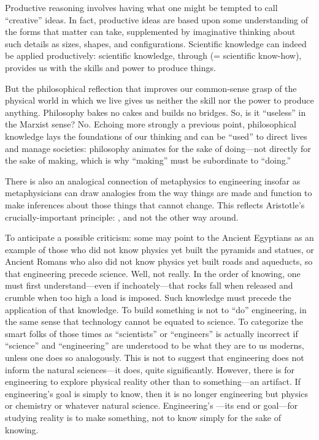 Productive reasoning involves having what one might be tempted to call ``creative'' ideas. In fact, productive ideas are based upon some understanding of the forms that matter can take, supplemented by imaginative thinking about such details as sizes, shapes, and configurations. Scientific knowledge can indeed be applied productively: scientific knowledge, through  (= scientific know-how), provides us with the skills and power to produce things.

But the philosophical reflection that improves our common-sense grasp of the physical world in which we live gives us neither the skill nor the power to produce anything. Philosophy bakes no cakes and builds no bridges. So, is it ``useless'' in the Marxist sense? No. Echoing more strongly a previous point, philosophical knowledge lays the foundations of our thinking and can be ``used'' to direct lives and manage societies: philosophy animates for the sake of doing---not directly for the sake of making, which is why ``making'' must be subordinate to ``doing.''

There is also an analogical connection of metaphysics to engineering insofar as metaphysicians can draw analogies from the way things are made and function to make inferences about those things that cannot change. This reflects Aristotle's crucially-important principle: , and not the other way around.

To anticipate a possible criticism: some may point to the Ancient Egyptians as an example of those who did not know physics yet built the pyramids and statues, or Ancient Romans who also did not know physics yet built roads and aqueducts, so that engineering  precede science. Well, not really. In the order of knowing, one must first understand---even if inchoately---that rocks fall when released and crumble when too high a load is imposed. Such knowledge must precede the application of that knowledge. To build something is not to ``do'' engineering, in the same sense that technology cannot be equated to science. To categorize the smart folks of those times as ``scientists'' or ``engineers'' is actually incorrect if ``science'' and ``engineering'' are understood to be what they are to us moderns, unless one does so analogously. This is not to suggest that engineering does not inform the natural sciences---it does, quite significantly. However, there is  for engineering to explore physical reality other than to  something---an artifact. If engineering's goal is simply to know, then it is no longer engineering but physics or chemistry or whatever natural science. Engineering's ---its end or goal---for studying reality is to make something, not to know simply for the sake of knowing.

